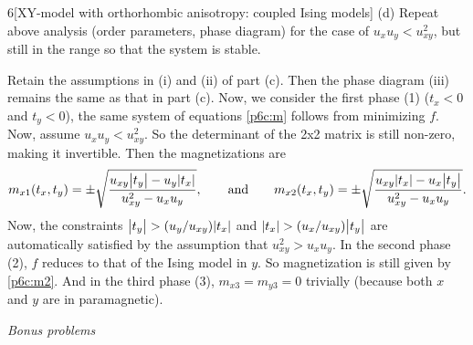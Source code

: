 \documentclass[12pt]{article}
\begin{document}
\begin{problem}{6}[XY-model with orthorhombic anisotropy: coupled Ising models]
(d) Repeat above analysis (order parameters, phase diagram) for the case of
$u_xu_y<u_{xy}^2$, but still in the range so that the system is stable.
\begin{solution}
Retain the assumptions in (i) and (ii) of part (c). Then the phase diagram
(iii) remains the same as that in part (c). Now, we consider the first phase (1)
($t_x<0$ and $t_y<0$), the same system of equations \eqref{p6c:m} follows from 
minimizing $f$. Now, assume $u_xu_y<u_{xy}^2$. So the determinant of the 2x2
matrix is still non-zero, making it invertible. Then the magnetizations are
\begin{equation}
    m_{x1}(t_x,t_y)=\pm\sqrt{\frac{u_{xy}\abs{t_y}-u_y\abs{t_x}}{u_{xy}^2-u_xu_y}},
    \qquad\text{and}\qquad 
    m_{x2}(t_x,t_y)=\pm\sqrt{\frac{u_{xy}\abs{t_x}-u_x\abs{t_y}}{u_{xy}^2-u_xu_y}}.
\end{equation}
Now, the constraints $\abs{t_y}>(u_y/u_{xy})\abs{t_x}$ and
$\abs{t_x}>(u_x/u_{xy})\abs{t_y}$ are automatically satisfied by the assumption
that $u_{xy}^2>u_xu_y$. In the second phase (2), $f$ reduces to that of the
Ising model in $y$. So magnetization is still given by \eqref{p6c:m2}. And in
the third phase (3), $m_{x3}=m_{y3}=0$ trivially (because both $x$ and $y$ are
in paramagnetic).
\end{solution}
\end{problem}
\newpage
\begin{center}
    \textit{Bonus problems}
\end{center}
\end{document}

